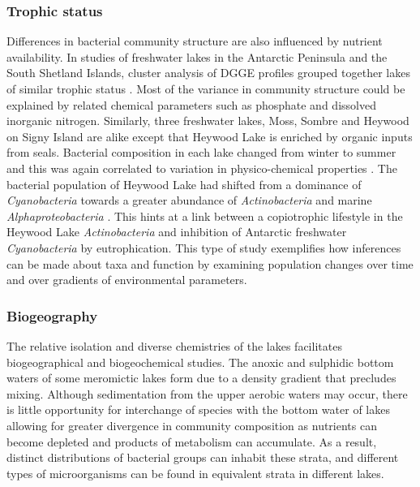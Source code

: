 \subsubsection{Trophic status}
Differences in bacterial community structure are also influenced by nutrient availability.
In studies of freshwater lakes in the Antarctic Peninsula and the South Shetland Islands, cluster analysis of \ac{DGGE} profiles grouped together lakes of similar trophic status \cite{Schiaffino2009, Villaescusa2010}.
Most of the variance in community structure could be explained by related chemical parameters such as phosphate and dissolved inorganic nitrogen.
Similarly, three freshwater lakes, Moss, Sombre and Heywood on Signy Island are alike except that Heywood Lake is enriched by organic inputs from seals.
Bacterial composition in each lake changed from winter to summer and this was again correlated to variation in physico-chemical properties \cite{Pearce2005a}. 
The bacterial population of Heywood Lake had shifted from a dominance of \emph{Cyanobacteria} towards a greater abundance of \emph{Actinobacteria} and marine \emph{Alphaproteobacteria} \cite{Pearce2005b}.
This hints at a link between a copiotrophic lifestyle in the Heywood Lake \emph{Actinobacteria} and inhibition of Antarctic freshwater \emph{Cyanobacteria} by eutrophication. 
This type of study exemplifies how inferences can be made about taxa and function by examining population changes over time and over gradients of environmental parameters.
\subsubsection{Biogeography}
The relative isolation and diverse chemistries of the lakes facilitates biogeographical and biogeochemical studies. 
The anoxic and sulphidic bottom waters of some meromictic lakes form due to a density gradient that precludes mixing. 
Although sedimentation from the upper aerobic waters may occur, there is little opportunity for interchange of species with the bottom water of lakes allowing for greater divergence in community composition as nutrients can become depleted and products of metabolism can accumulate.
As a result, distinct distributions of bacterial groups can inhabit these strata, and different types of microorganisms can be found in equivalent strata in different lakes. 

